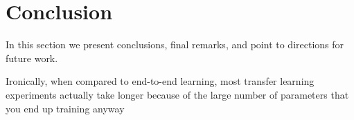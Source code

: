 \chapter{Conclusion}
\label{chapter:conclusion}

In this section we present conclusions, final remarks, and point to directions for future work.

Ironically, when compared to end-to-end learning, most transfer learning experiments actually take longer because of the large number of parameters that you end up training anyway
